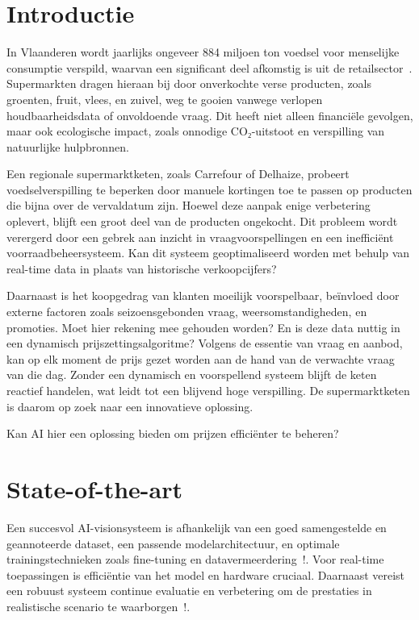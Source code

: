 
\section{Introductie}%
\label{sec:introductie}
In Vlaanderen wordt jaarlijks ongeveer 884 miljoen ton voedsel voor menselijke consumptie verspild, waarvan een significant deel afkomstig is uit de retailsector~\autocite{OVAM}.
Supermarkten dragen hieraan bij door onverkochte verse producten, zoals groenten, fruit, vlees, en zuivel,
weg te gooien vanwege verlopen houdbaarheidsdata of onvoldoende vraag. Dit heeft niet alleen financiële gevolgen,
maar ook ecologische impact, zoals onnodige CO₂-uitstoot en verspilling van natuurlijke hulpbronnen.

Een regionale supermarktketen, zoals Carrefour of Delhaize, probeert voedselverspilling te beperken door manuele kortingen toe te passen op producten die bijna over de vervaldatum zijn.
Hoewel deze aanpak enige verbetering oplevert, blijft een groot deel van de producten ongekocht.
Dit probleem wordt verergerd door een gebrek aan inzicht in vraagvoorspellingen en een inefficiënt voorraadbeheersysteem.
Kan dit systeem geoptimaliseerd worden met behulp van real-time data in plaats van historische verkoopcijfers?

Daarnaast is het koopgedrag van klanten moeilijk voorspelbaar, beïnvloed door externe factoren zoals seizoensgebonden vraag,
weersomstandigheden, en promoties.
Moet hier rekening mee gehouden worden?
En is deze data nuttig in een dynamisch prijszettingsalgoritme?
Volgens de essentie van vraag en aanbod, kan op elk moment de prijs gezet worden aan de hand van de verwachte vraag van die dag.
Zonder een dynamisch en voorspellend systeem blijft de keten reactief handelen,
wat leidt tot een blijvend hoge verspilling.
De supermarktketen is daarom op zoek naar een innovatieve oplossing.

Kan AI hier een oplossing bieden om prijzen efficiënter te beheren?

\section{State-of-the-art}%
\label{sec:state-of-the-art}
Een succesvol AI-visionsysteem is afhankelijk van een goed samengestelde en geannoteerde dataset, een passende modelarchitectuur,
en optimale trainingstechnieken zoals fine-tuning en datavermeerdering~\autocite{Goodfellow-et-al-2016}!. Voor real-time toepassingen is efficiëntie van het model en hardware cruciaal.
Daarnaast vereist een robuust systeem continue evaluatie en verbetering om de prestaties in realistische scenario te waarborgen~\autocite{DBLP:journals/corr/abs-1905-05055}!.



